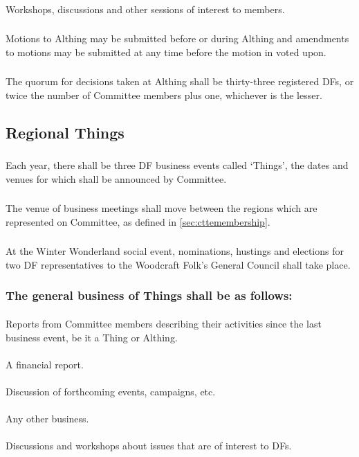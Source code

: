 \documentclass[a4paper, 12pt]{article}
\begin{document}
\paragraph{}
Workshops, discussions and other sessions of interest to members.
\subsubsection{}
Motions to Althing may be submitted before or during Althing and amendments to motions may be submitted at any time before the motion in voted upon.
\subsubsection{}
The quorum for decisions taken at Althing shall be thirty-three registered DFs, or twice the number of Committee members plus one, whichever is the lesser.

\subsection{Regional Things}
\subsubsection{}
Each year, there shall be three DF business events called `Things', the dates and venues for which shall be announced by Committee.
\subsubsection{}
The venue of business meetings shall move between the regions which are represented on Committee, as defined in \ref{sec:cttemembership}.
\subsubsection{}
At the Winter Wonderland social event, nominations, hustings and elections for two DF representatives to the Woodcraft Folk's General Council shall take place.
\subsubsection{The general business of Things shall be as follows:}
\paragraph{}
Reports from Committee members describing their activities since the last business event, be it a Thing or Althing.
\paragraph{}
A financial report.
\paragraph{}
Discussion of forthcoming events, campaigns, etc. 
\paragraph{}
Any other business.
\paragraph{}
Discussions and workshops about issues that are of interest to DFs. 
\end{document}

